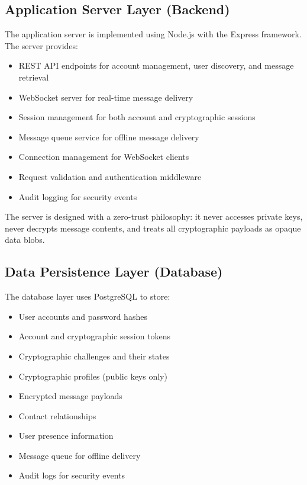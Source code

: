 \documentclass[12pt,a4paper,openany]{book}
\begin{document}
\subsection{Application Server Layer (Backend)}

The application server is implemented using Node.js with the Express framework. The server provides:

\begin{itemize}
\item REST API endpoints for account management, user discovery, and message retrieval
\item WebSocket server for real-time message delivery
\item Session management for both account and cryptographic sessions
\item Message queue service for offline message delivery
\item Connection management for WebSocket clients
\item Request validation and authentication middleware
\item Audit logging for security events
\end{itemize}

The server is designed with a zero-trust philosophy: it never accesses private keys, never decrypts message contents, and treats all cryptographic payloads as opaque data blobs.

\subsection{Data Persistence Layer (Database)}

The database layer uses PostgreSQL \cite{postgresql} to store:

\begin{itemize}
\item User accounts and password hashes
\item Account and cryptographic session tokens
\item Cryptographic challenges and their states
\item Cryptographic profiles (public keys only)
\item Encrypted message payloads
\item Contact relationships
\item User presence information
\item Message queue for offline delivery
\item Audit logs for security events
\end{itemize}
\end{document}
